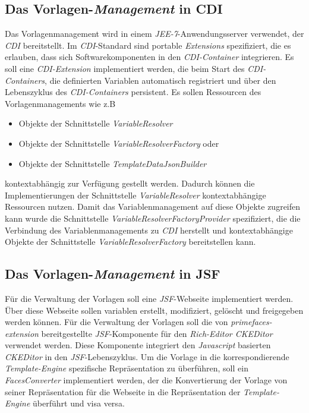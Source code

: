 \subsection{Das Vorlagen-\emph{Management} in CDI}
Das Vorlagenmanagement wird in einem \emph{JEE-7}-Anwendungsserver verwendet, der \emph{CDI} bereitstellt. Im \emph{CDI}-Standard sind portable \emph{Extensions} spezifiziert, die es erlauben, dass sich Softwarekomponenten in den \emph{CDI-Container} integrieren. Es soll eine \emph{CDI-Extension} implementiert werden, die beim Start des \emph{CDI-Containers}, die definierten Variablen automatisch registriert und über den Lebenszyklus des \emph{CDI-Containers} persistent. Es sollen Ressourcen des Vorlagenmanagements wie z.B
\begin{itemize}
	\item Objekte der Schnittstelle \emph{VariableResolver}
	\item Objekte der Schnittstelle \emph{VariableResolverFactory} oder
	\item Objekte der Schnittstelle \emph{TemplateDataJsonBuilder}
\end{itemize}
kontextabhängig zur Verfügung gestellt werden. Dadurch können die Implementierungen der Schnittstelle \emph{VariableResolver} kontextabhängige Ressourcen nutzen. Damit das Variablenmanagement auf diese Objekte zugreifen kann wurde die Schnittstelle \emph{VariableResolverFactoryProvider} spezifiziert, die die Verbindung des Variablenmanagements zu \emph{CDI} herstellt und kontextabhängige Objekte der Schnittstelle \emph{VariableResolverFactory} bereitstellen kann.

\subsection{Das Vorlagen-\emph{Management} in JSF}
Für die Verwaltung der Vorlagen soll eine \emph{JSF}-Webseite implementiert werden. Über diese Webseite sollen variablen erstellt, modifiziert, gelöscht und freigegeben werden können. Für die Verwaltung der Vorlagen soll die von \emph{primefaces-extension} bereitgestellte \emph{JSF}-Komponente für den \emph{Rich-Editor CKEDitor} verwendet werden. Diese Komponente integriert den \emph{Javascript} basierten \emph{CKEDitor} in den \emph{JSF}-Lebenszyklus. Um die Vorlage in die korrespondierende \emph{Template-Engine} spezifische Repräsentation zu überführen, soll ein \emph{FacesConverter} implementiert werden, der die Konvertierung der Vorlage von seiner Repräsentation für die Webseite in die Repräsentation der \emph{Template-Engine} überführt und visa versa.


